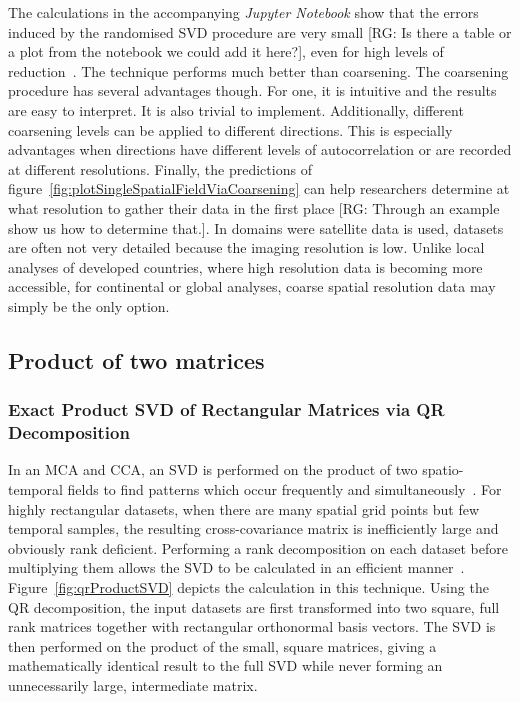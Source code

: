 \documentclass[ijgi,article,submit,moreauthors,pdftex,10pt,a4paper]{Definitions/mdpi}
\begin{document}
The calculations in the accompanying \textit{Jupyter Notebook} show that the errors induced by the randomised SVD procedure are very small [RG: Is there a table or a plot from the notebook we could add it here?], even for high levels of reduction~\cite{Bogaardt2018}. The technique performs much better than coarsening. The coarsening procedure has several advantages though. For one, it is intuitive and the results are easy to interpret. It is also trivial to implement. Additionally, different coarsening levels can be applied to different directions. This is especially advantages when directions have different levels of autocorrelation or are recorded at different resolutions. Finally, the predictions of figure~\ref{fig:plotSingleSpatialFieldViaCoarsening} can help researchers determine at what resolution to gather their data in the first place [RG: Through an example show us how to determine that.]. In domains were satellite data is used, datasets are often not very detailed because the imaging resolution is low. Unlike local analyses of developed countries, where high resolution data is becoming more accessible, for continental or global analyses, coarse spatial resolution data may simply be the only option.


\subsection{Product of two matrices}

\subsubsection{Exact Product SVD of Rectangular Matrices via QR Decomposition}
\label{sec:Results/Exact Product SVD of Rectangular Matrices via QR Decomposition}
In an MCA and CCA, an SVD is performed on the product of two spatio-temporal fields to find patterns which occur frequently and simultaneously~\cite{Eshel2011, Storch1999}. For highly rectangular datasets, when there are many spatial grid points but few temporal samples, the resulting cross-covariance matrix is inefficiently large and obviously rank deficient. Performing a rank decomposition on each dataset before multiplying them allows the SVD to be calculated in an efficient manner~\cite{Chan1982, Tygert2017}. Figure~\ref{fig:qrProductSVD} depicts the calculation in this technique. Using the QR decomposition, the input datasets are first transformed into two square, full rank matrices together with rectangular orthonormal basis vectors. The SVD is then performed on the product of the small, square matrices, giving a mathematically identical result to the full SVD while never forming an unnecessarily large, intermediate matrix.
\end{document}
